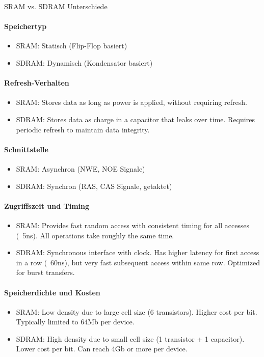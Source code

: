 \begin{concept}{SRAM vs. SDRAM Unterschiede}
    \paragraph{Speichertyp}
    \begin{itemize}
        \item SRAM: Statisch (Flip-Flop basiert)
        \item SDRAM: Dynamisch (Kondensator basiert)
    \end{itemize}
    
    \paragraph{Refresh-Verhalten}
    \begin{itemize}
        \item SRAM: Stores data as long as power is applied, without requiring refresh.
        \item SDRAM: Stores data as charge in a capacitor that leaks over time. Requires periodic refresh to maintain data integrity.
    \end{itemize}
    
    \paragraph{Schnittstelle}
    \begin{itemize}
        \item SRAM: Asynchron (NWE, NOE Signale)
        \item SDRAM: Synchron (RAS, CAS Signale, getaktet)
    \end{itemize}
    
    \paragraph{Zugriffszeit und Timing}
    \begin{itemize}
        \item SRAM: Provides fast random access with consistent timing for all accesses (~5ns). All operations take roughly the same time.
        \item SDRAM: Synchronous interface with clock. Has higher latency for first access in a row (~60ns), but very fast subsequent access within same row. Optimized for burst transfers.
    \end{itemize}
    
    \paragraph{Speicherdichte und Kosten}
    \begin{itemize}
        \item SRAM: Low density due to large cell size (6 transistors). Higher cost per bit. Typically limited to 64Mb per device.
        \item SDRAM: High density due to small cell size (1 transistor + 1 capacitor). Lower cost per bit. Can reach 4Gb or more per device.
    \end{itemize}


\end{concept}
